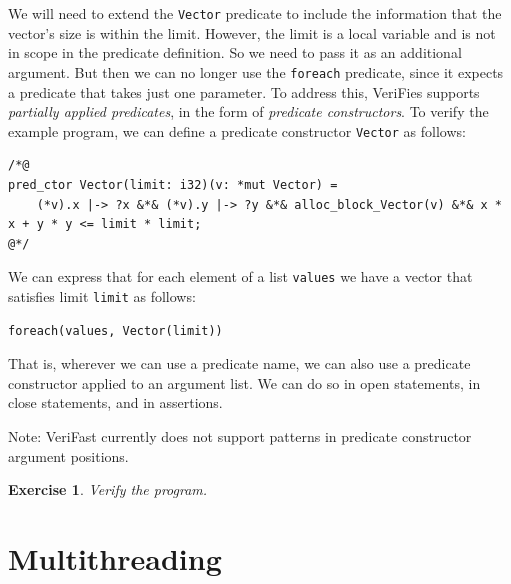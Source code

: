 \documentclass{article}
\newtheorem{exercise}{Exercise}
\begin{document}
We will need to extend the \lstinline!Vector! predicate to
include the information that the vector's size is within the
limit. However, the limit is a local variable and is not in
scope in the predicate definition. So we need to pass it as an
additional argument. But then we can no longer use the
\lstinline!foreach! predicate, since it expects a predicate
that takes just one parameter. To address this, VeriFies
supports \emph{partially applied predicates}, in the form of
\emph{predicate constructors}. To verify the example program,
we can define a predicate constructor \lstinline!Vector! as
follows:
\begin{lstlisting}
/*@
pred_ctor Vector(limit: i32)(v: *mut Vector) =
    (*v).x |-> ?x &*& (*v).y |-> ?y &*& alloc_block_Vector(v) &*& x * x + y * y <= limit * limit;
@*/
\end{lstlisting}
We can express that for each element of a list
\lstinline!values! we have a vector that satisfies limit
\lstinline!limit! as follows:
\begin{lstlisting}
foreach(values, Vector(limit))
\end{lstlisting}
That is, wherever we can use a predicate name, we can also use
a predicate constructor applied to an argument list. We can do
so in open statements, in close statements, and in assertions.

Note: VeriFast currently does not support patterns in predicate
constructor argument positions.

\begin{exercise}\label{exercise:predctors}
Verify the program.
\end{exercise}

\section{Multithreading}\label{section:multithreading}
\end{document}

